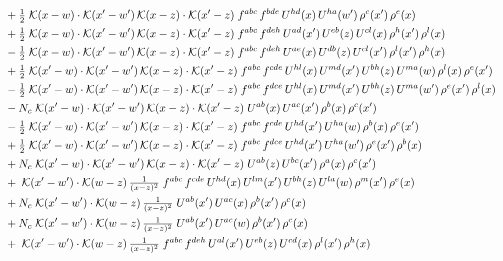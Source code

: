 \documentclass[10pt]{article}
\numberwithin{equation}{section}
\begin{document}
\begin{align}
&\quad +\tfrac{1}{2}\;\mathcal{K}(x-w)\cdot\mathcal{K}(x'-w')\,\mathcal{K}(x-z)\cdot\mathcal{K}(x'-z)\;f^{abc}\,f^{bde}\,U^{hd}(x)\,U^{ha}(w')\,\rho^{c}(x')\,\rho^{e}(x)\notag\\
&\quad +\tfrac{1}{2}\;\mathcal{K}(x-w)\cdot\mathcal{K}(x'-w')\,\mathcal{K}(x-z)\cdot\mathcal{K}(x'-z)\;f^{abc}\,f^{deh}\,U^{ad}(x')\,U^{eb}(z)\,U^{cl}(x)\,\rho^{h}(x')\,\rho^{l}(x)\notag\\
&\quad -\tfrac{1}{2}\;\mathcal{K}(x-w)\cdot\mathcal{K}(x'-w')\,\mathcal{K}(x-z)\cdot\mathcal{K}(x'-z)\;f^{abc}\,f^{deh}\,U^{ae}(x)\,U^{db}(z)\,U^{cl}(x')\,\rho^{l}(x')\,\rho^{h}(x)\notag\\
&\quad +\tfrac{1}{2}\;\mathcal{K}(x'-w)\cdot\mathcal{K}(x'-w')\,\mathcal{K}(x-z)\cdot\mathcal{K}(x'-z)\;f^{abc}\,f^{cde}\,U^{hl}(x)\,U^{md}(x')\,U^{bh}(z)\,U^{ma}(w)\,\rho^{l}(x)\,\rho^{e}(x')\notag\\
&\quad -\tfrac{1}{2}\;\mathcal{K}(x'-w)\cdot\mathcal{K}(x'-w')\,\mathcal{K}(x-z)\cdot\mathcal{K}(x'-z)\;f^{abc}\,f^{dce}\,U^{hl}(x)\,U^{md}(x')\,U^{bh}(z)\,U^{ma}(w')\,\rho^{e}(x')\,\rho^{l}(x)\notag\\
&\quad -N_c\;\mathcal{K}(x'-w)\cdot\mathcal{K}(x'-w')\,\mathcal{K}(x-z)\cdot\mathcal{K}(x'-z)\;U^{ab}(x)\,U^{ac}(x')\,\rho^{b}(x)\,\rho^{c}(x')\notag\\
&\quad -\tfrac{1}{2}\;\mathcal{K}(x'-w)\cdot\mathcal{K}(x'-w')\,\mathcal{K}(x-z)\cdot\mathcal{K}(x'-z)\;f^{abc}\,f^{cde}\,U^{hd}(x')\,U^{ha}(w)\,\rho^{b}(x)\,\rho^{e}(x')\notag\\
&\quad +\tfrac{1}{2}\;\mathcal{K}(x'-w)\cdot\mathcal{K}(x'-w')\,\mathcal{K}(x-z)\cdot\mathcal{K}(x'-z)\;f^{abc}\,f^{dce}\,U^{hd}(x')\,U^{ha}(w')\,\rho^{e}(x')\,\rho^{b}(x)\notag\\
&\quad +N_c\;\mathcal{K}(x'-w)\cdot\mathcal{K}(x'-w')\,\mathcal{K}(x-z)\cdot\mathcal{K}(x'-z)\;U^{ab}(z)\,U^{bc}(x')\,\rho^{a}(x)\,\rho^{c}(x')\notag\\
&\quad +\;\mathcal{K}(x'-w')\cdot\mathcal{K}(w-z)\,\tfrac{1}{(x-z)^{2}}\;f^{abc}\,f^{cde}\,U^{hd}(x)\,U^{lm}(x')\,U^{bh}(z)\,U^{la}(w)\,\rho^{m}(x')\,\rho^{e}(x)\notag\\
&\quad +N_c\;\mathcal{K}(x'-w')\cdot\mathcal{K}(w-z)\,\tfrac{1}{(x-z)^{2}}\;U^{ab}(x')\,U^{ac}(x)\,\rho^{b}(x')\,\rho^{c}(x)\notag\\
&\quad +N_c\;\mathcal{K}(x'-w')\cdot\mathcal{K}(w-z)\,\tfrac{1}{(x-z)^{2}}\;U^{ab}(x')\,U^{ac}(w)\,\rho^{b}(x')\,\rho^{c}(x)\notag\\
&\quad +\;\mathcal{K}(x'-w')\cdot\mathcal{K}(w-z)\,\tfrac{1}{(x-z)^{2}}\;f^{abc}\,f^{deh}\,U^{al}(x')\,U^{eb}(z)\,U^{cd}(x)\,\rho^{l}(x')\,\rho^{h}(x)\notag\\

\end{align}
\end{document}
